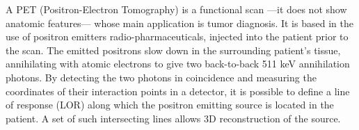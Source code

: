 \documentclass[11pt,a4paper]{article}
\begin{document}
A PET (Positron-Electron Tomography) is a functional scan ---it does not show anatomic features--- whose main application is tumor diagnosis. It is based in the use of positron emitters radio-pharmaceuticals, injected into the patient prior to the scan. The emitted positrons slow down in the surrounding patient’s tissue, annihilating with atomic electrons to give two back-to-back 511 keV annihilation photons. By detecting the two photons in coincidence and measuring the coordinates of their interaction points in a detector, it is possible to define a line of response (LOR) along which the positron emitting source is located in the patient. A set of such intersecting lines allows 3D reconstruction of the source. 

\end{document}
